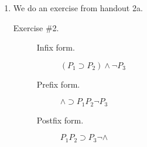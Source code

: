 \documentclass[11pt,letterpaper]{article}
\renewcommand{\implies}{\supset}
\begin{document}
\begin{enumerate}
\begin{description}
        \begin{align*}
          A %
          &\ann{Ax6[$A/A, \neg A / B$]}
          \\
          A \land \neg A \implies \neg A
          &\ann{Ax7[ $A/A, \neg A / B$ ]}
          \\
          (\neg A \implies A \implies B)
          \implies
          A \land \neg A
          \implies \neg A \implies A \implies B
          &\ann{Ax2[$\neg A \implies A \implies B / B, A \land \neg A / A$]}
          \\
          A \land \neg A \implies \neg A \implies A \implies B
          &\ann{MP 3, 4}
          \\
          (A \land \neg A \implies \neg A \implies A \implies B)
          \implies
          (A \land \neg A \implies \neg A)
          \implies
          A \land \neg A
          \implies
          A
          \implies
          B
          &\ann{Ax4[$A \land \neg A / A, \neg A / B, A \implies B / C$]}
          \\
          (A \land \neg A \implies \neg A)
          \implies
          A \land \neg A
          \implies
          A \implies B
          &\ann{MP 5, 6}
          \\
          A \land \neg A \implies A \implies B
          &\ann{MP 2,7}
          \\
          (A \land \neg A \implies A \implies B)
          \implies
          (A \land \neg A \implies A)
          \implies
          A \land \neg A
          \implies B
          &\ann{Ax4[$A \land \neg A / A, A / B, B / C$]}
          \\
          (A \land \neg A \implies A)
          \implies
          A \land \neg A
          \implies
          B
          &\ann{MP 8, 9}
          \\
          A \land \neg A \implies B
          &\ann{MP 1, 10}
        \end{align*}
    \end{description}

  \item
    We do an exercise from handout 2a.

    \begin{description}
      \item[Exercise \#2.]
        \begin{description}
          \item[Infix form.] $(P_1 \implies P_2) \land \neg P_3$
          \item[Prefix form.] $\land \implies P_1 P_2 \neg P_3$
          \item[Postfix form.] $P_1 P_2 \implies P_3 \neg \land$
        \end{description}
    \end{description}
\end{enumerate}
\end{document}
